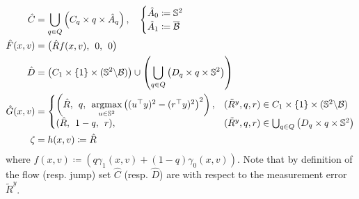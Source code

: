 \documentclass{article}
\newcommand{\brackets}[1]{\left(#1\right)}
\newcommand{\textblue}[1]{\textcolor{blue}{#1}}
\newcommand{\Rtilde}{\tilde{R}}
\begin{document}
\begin{subequations}\label{eq:hybrid_PCF}
\begin{align}
    \hat{C} &= \bigcup_{q\in Q}\brackets{{C}_{q}\times q \times \hat{A}_q}, \quad \begin{cases}
        \hat{A}_0 \coloneqq \mathbb{S}^2\\
        \hat{A}_1 \coloneqq \overline{\mathcal{B}}
    \end{cases}\\
    \hat{F}(x, v) &= \begin{pmatrix}
        \hat{R}f(x,v), \:\: 0, \:\: 0
    \end{pmatrix}\label{eq:13b}\\
    \hat{D} &= {\brackets{C_1\times\{1\}\times (\mathbb{S}^2\backslash \mathcal{B})} \cup \brackets{\bigcup_{q\in Q} \brackets{{D}_{q}\times q\times \mathbb{S}^2}}}\\
    \hat{G}(x, v) &= \left\{\begin{array}{@{}ll@{}}
        \brackets{\hat{R}, \:\: q,\:\: \underset{u\in\mathbb{S}^2}{\mathrm{argmax}}\left((u^\top y)^2 - (r^\top y)^2\right)^2}, &(\Rtilde^y, q, r)\in C_1\times \{1\}\times (\mathbb{S}^2\backslash \mathcal{B})\\
            (\hat{R}, \:\: 1-q,\:\: r),
        &(\Rtilde^y, q, r)\in \bigcup_{q\in Q} \brackets{{D}_{q}\times q\times \mathbb{S}^2}
    \end{array}\right.\\
    \zeta &= h(x,v)\coloneqq \hat{R} \label{eq:output_hybrid}
\end{align}
\end{subequations}
where $f(x,v)\coloneqq \left(q\gamma_1(x,v) + (1-q)\gamma_0(x,v)\right)$. Note that by definition of the flow (resp. jump) set $\hat{C}$ (resp. $\hat{D}$) are with respect to the measurement error $\Rtilde^y$. 



\end{document}
